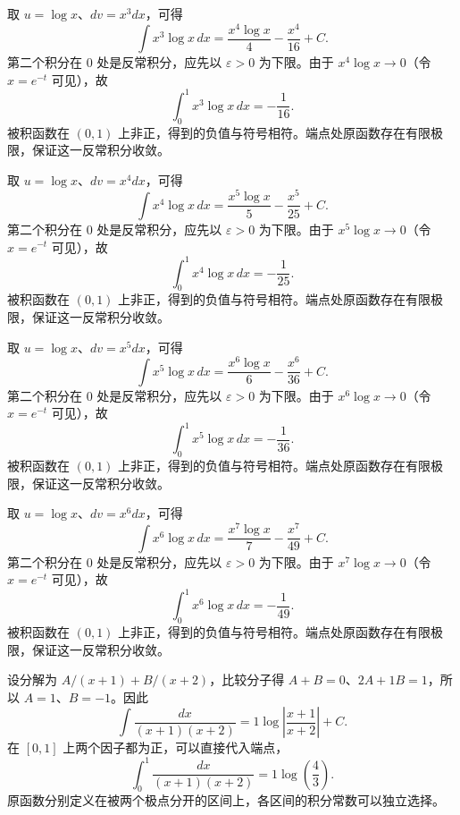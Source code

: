 \documentclass[UTF8,12pt,a4paper,fontset=fandol]{ctexart}
\begin{document}
\begin{solve}\label{ans:c13q9}
取 $u=\log x$、$dv=x^{3}dx$，可得
\[
\int x^{3}\log x\,dx=\frac{x^{4}\log x}{4}-\frac{x^{4}}{16}+C.
\]
第二个积分在 $0$ 处是反常积分，应先以 $\varepsilon>0$ 为下限。由于 $x^{4}\log x\to0$（令 $x=e^{-t}$ 可见），故
\[
\int_0^1x^{3}\log x\,dx=-\frac{1}{16}.
\]
被积函数在 $(0,1)$ 上非正，得到的负值与符号相符。端点处原函数存在有限极限，保证这一反常积分收敛。
\end{solve}

\begin{solve}\label{ans:c13q10}
取 $u=\log x$、$dv=x^{4}dx$，可得
\[
\int x^{4}\log x\,dx=\frac{x^{5}\log x}{5}-\frac{x^{5}}{25}+C.
\]
第二个积分在 $0$ 处是反常积分，应先以 $\varepsilon>0$ 为下限。由于 $x^{5}\log x\to0$（令 $x=e^{-t}$ 可见），故
\[
\int_0^1x^{4}\log x\,dx=-\frac{1}{25}.
\]
被积函数在 $(0,1)$ 上非正，得到的负值与符号相符。端点处原函数存在有限极限，保证这一反常积分收敛。
\end{solve}

\begin{solve}\label{ans:c13q11}
取 $u=\log x$、$dv=x^{5}dx$，可得
\[
\int x^{5}\log x\,dx=\frac{x^{6}\log x}{6}-\frac{x^{6}}{36}+C.
\]
第二个积分在 $0$ 处是反常积分，应先以 $\varepsilon>0$ 为下限。由于 $x^{6}\log x\to0$（令 $x=e^{-t}$ 可见），故
\[
\int_0^1x^{5}\log x\,dx=-\frac{1}{36}.
\]
被积函数在 $(0,1)$ 上非正，得到的负值与符号相符。端点处原函数存在有限极限，保证这一反常积分收敛。
\end{solve}

\begin{solve}\label{ans:c13q12}
取 $u=\log x$、$dv=x^{6}dx$，可得
\[
\int x^{6}\log x\,dx=\frac{x^{7}\log x}{7}-\frac{x^{7}}{49}+C.
\]
第二个积分在 $0$ 处是反常积分，应先以 $\varepsilon>0$ 为下限。由于 $x^{7}\log x\to0$（令 $x=e^{-t}$ 可见），故
\[
\int_0^1x^{6}\log x\,dx=-\frac{1}{49}.
\]
被积函数在 $(0,1)$ 上非正，得到的负值与符号相符。端点处原函数存在有限极限，保证这一反常积分收敛。
\end{solve}

\begin{solve}\label{ans:c13q13}
设分解为 $A/(x+1)+B/(x+2)$，比较分子得 $A+B=0$、$2A+1B=1$，所以 $A=1$、$B=-1$。因此
\[
\int\frac{dx}{(x+1)(x+2)}=1\log\left|\frac{x+1}{x+2}\right|+C.
\]
在 $[0,1]$ 上两个因子都为正，可以直接代入端点，
\[
\int_0^1\frac{dx}{(x+1)(x+2)}=1\log\left(\frac{4}{3}\right).
\]
原函数分别定义在被两个极点分开的区间上，各区间的积分常数可以独立选择。
\end{solve}
\end{document}

